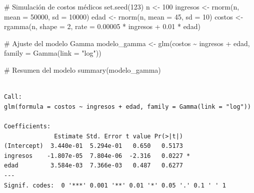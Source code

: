 \documentclass[
  letterpaper,
  DIV=11,
  numbers=noendperiod]{scrreprt}
\newenvironment{Shaded}{\begin{snugshade}}{\end{snugshade}}
\newcommand{\AttributeTok}[1]{\textcolor[rgb]{0.40,0.45,0.13}{#1}}
\newcommand{\CommentTok}[1]{\textcolor[rgb]{0.37,0.37,0.37}{#1}}
\newcommand{\DecValTok}[1]{\textcolor[rgb]{0.68,0.00,0.00}{#1}}
\newcommand{\FloatTok}[1]{\textcolor[rgb]{0.68,0.00,0.00}{#1}}
\newcommand{\FunctionTok}[1]{\textcolor[rgb]{0.28,0.35,0.67}{#1}}
\newcommand{\NormalTok}[1]{\textcolor[rgb]{0.00,0.23,0.31}{#1}}
\newcommand{\OtherTok}[1]{\textcolor[rgb]{0.00,0.23,0.31}{#1}}
\newcommand{\SpecialCharTok}[1]{\textcolor[rgb]{0.37,0.37,0.37}{#1}}
\newcommand{\StringTok}[1]{\textcolor[rgb]{0.13,0.47,0.30}{#1}}
\begin{document}
\begin{tcolorbox}[enhanced jigsaw, breakable, toprule=.15mm, bottomtitle=1mm, coltitle=black, colbacktitle=quarto-callout-tip-color!10!white, titlerule=0mm, opacitybacktitle=0.6, bottomrule=.15mm, toptitle=1mm, title=\textcolor{quarto-callout-tip-color}{\faLightbulb}\hspace{0.5em}{Ejemplo}, arc=.35mm, rightrule=.15mm, opacityback=0, colframe=quarto-callout-tip-color-frame, leftrule=.75mm, left=2mm, colback=white]

\begin{Shaded}
\begin{Highlighting}[]
\CommentTok{\# Simulación de costos médicos}
\FunctionTok{set.seed}\NormalTok{(}\DecValTok{123}\NormalTok{)}
\NormalTok{n }\OtherTok{\textless{}{-}} \DecValTok{100}
\NormalTok{ingresos }\OtherTok{\textless{}{-}} \FunctionTok{rnorm}\NormalTok{(n, }\AttributeTok{mean =} \DecValTok{50000}\NormalTok{, }\AttributeTok{sd =} \DecValTok{10000}\NormalTok{)}
\NormalTok{edad }\OtherTok{\textless{}{-}} \FunctionTok{rnorm}\NormalTok{(n, }\AttributeTok{mean =} \DecValTok{45}\NormalTok{, }\AttributeTok{sd =} \DecValTok{10}\NormalTok{)}
\NormalTok{costos }\OtherTok{\textless{}{-}} \FunctionTok{rgamma}\NormalTok{(n, }\AttributeTok{shape =} \DecValTok{2}\NormalTok{, }\AttributeTok{rate =} \FloatTok{0.00005} \SpecialCharTok{*}\NormalTok{ ingresos }\SpecialCharTok{+} \FloatTok{0.01} \SpecialCharTok{*}\NormalTok{ edad)}

\CommentTok{\# Ajuste del modelo Gamma}
\NormalTok{modelo\_gamma }\OtherTok{\textless{}{-}} \FunctionTok{glm}\NormalTok{(costos }\SpecialCharTok{\textasciitilde{}}\NormalTok{ ingresos }\SpecialCharTok{+}\NormalTok{ edad, }\AttributeTok{family =} \FunctionTok{Gamma}\NormalTok{(}\AttributeTok{link =} \StringTok{"log"}\NormalTok{))}

\CommentTok{\# Resumen del modelo}
\FunctionTok{summary}\NormalTok{(modelo\_gamma)}
\end{Highlighting}
\end{Shaded}

\begin{verbatim}

Call:
glm(formula = costos ~ ingresos + edad, family = Gamma(link = "log"))

Coefficients:
              Estimate Std. Error t value Pr(>|t|)  
(Intercept)  3.440e-01  5.294e-01   0.650   0.5173  
ingresos    -1.807e-05  7.804e-06  -2.316   0.0227 *
edad         3.584e-03  7.366e-03   0.487   0.6277  
---
Signif. codes:  0 '***' 0.001 '**' 0.01 '*' 0.05 '.' 0.1 ' ' 1


\end{verbatim}
\end{tcolorbox}
\end{document}
